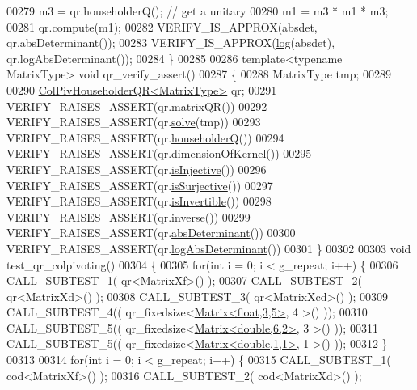 \begin{DoxyCode}
00279   m3 = qr.householderQ(); \textcolor{comment}{// get a unitary}
00280   m1 = m3 * m1 * m3;
00281   qr.compute(m1);
00282   VERIFY\_IS\_APPROX(absdet, qr.absDeterminant());
00283   VERIFY\_IS\_APPROX(\hyperlink{structlog}{log}(absdet), qr.logAbsDeterminant());
00284 \}
00285 
00286 \textcolor{keyword}{template}<\textcolor{keyword}{typename} MatrixType> \textcolor{keywordtype}{void} qr\_verify\_assert()
00287 \{
00288   MatrixType tmp;
00289 
00290   \hyperlink{group___q_r___module}{ColPivHouseholderQR<MatrixType>} qr;
00291   VERIFY\_RAISES\_ASSERT(qr.\hyperlink{group___q_r___module_aa572ac050c8d4fadd4f08a87f6b1e62b}{matrixQR}())
00292   VERIFY\_RAISES\_ASSERT(qr.\hyperlink{group___q_r___module_aaa9c4af89930ab3bb7612ed9ae33d3f5}{solve}(tmp))
00293   VERIFY\_RAISES\_ASSERT(qr.\hyperlink{group___q_r___module_a28ab9d8916ca609c5469c4c192fbfa28}{householderQ}())
00294   VERIFY\_RAISES\_ASSERT(qr.\hyperlink{group___q_r___module_a7c9294565d179226133770160b827be1}{dimensionOfKernel}())
00295   VERIFY\_RAISES\_ASSERT(qr.\hyperlink{group___q_r___module_a0031998053c9c7345c9458f7443aa263}{isInjective}())
00296   VERIFY\_RAISES\_ASSERT(qr.\hyperlink{group___q_r___module_a87a7d06e0b0479e5b56b19c2a4f56365}{isSurjective}())
00297   VERIFY\_RAISES\_ASSERT(qr.\hyperlink{group___q_r___module_a945720f8d683f8ebe97fa807edd3142a}{isInvertible}())
00298   VERIFY\_RAISES\_ASSERT(qr.\hyperlink{group___q_r___module_a31c45402e74774d9cd13af0e57a6b72f}{inverse}())
00299   VERIFY\_RAISES\_ASSERT(qr.\hyperlink{group___q_r___module_ac87c3bf42098d6f7324dafbc50fa83f7}{absDeterminant}())
00300   VERIFY\_RAISES\_ASSERT(qr.\hyperlink{group___q_r___module_afdc29438a335871f67449c253369ce12}{logAbsDeterminant}())
00301 \}
00302 
00303 \textcolor{keywordtype}{void} test\_qr\_colpivoting()
00304 \{
00305   \textcolor{keywordflow}{for}(\textcolor{keywordtype}{int} i = 0; i < g\_repeat; i++) \{
00306     CALL\_SUBTEST\_1( qr<MatrixXf>() );
00307     CALL\_SUBTEST\_2( qr<MatrixXd>() );
00308     CALL\_SUBTEST\_3( qr<MatrixXcd>() );
00309     CALL\_SUBTEST\_4(( qr\_fixedsize<\hyperlink{group___core___module_class_eigen_1_1_matrix}{Matrix<float,3,5>}, 4 >() ));
00310     CALL\_SUBTEST\_5(( qr\_fixedsize<\hyperlink{group___core___module_class_eigen_1_1_matrix}{Matrix<double,6,2>}, 3 >() ));
00311     CALL\_SUBTEST\_5(( qr\_fixedsize<\hyperlink{group___core___module_class_eigen_1_1_matrix}{Matrix<double,1,1>}, 1 >() ));
00312   \}
00313 
00314   \textcolor{keywordflow}{for}(\textcolor{keywordtype}{int} i = 0; i < g\_repeat; i++) \{
00315     CALL\_SUBTEST\_1( cod<MatrixXf>() );
00316     CALL\_SUBTEST\_2( cod<MatrixXd>() );

\end{DoxyCode}
